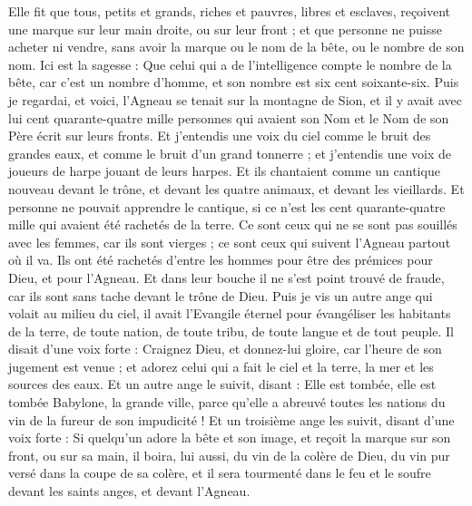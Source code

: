 \begin{multicols}{2}
Elle fit que tous, petits et grands, riches et pauvres, libres et esclaves, reçoivent une marque sur leur main droite, ou sur leur front ;
et que personne ne puisse acheter ni vendre, sans avoir la marque ou le nom de la bête, ou le nombre de son nom.
Ici est la sagesse : Que celui qui a de l'intelligence compte le nombre de la bête, car c'est un nombre d'homme, et son nombre est six cent soixante-six.
\VerseOne{}Puis je regardai, et voici, l'Agneau se tenait sur la montagne de Sion, et il y avait avec lui cent quarante-quatre mille personnes qui avaient son Nom et le Nom de son Père écrit sur leurs fronts.
Et j'entendis une voix du ciel comme le bruit des grandes eaux, et comme le bruit d'un grand tonnerre ; et j'entendis une voix de joueurs de harpe jouant de leurs harpes.
Et ils chantaient comme un cantique nouveau devant le trône, et devant les quatre animaux, et devant les vieillards. Et personne ne pouvait apprendre le cantique, si ce n'est les cent quarante-quatre mille qui avaient été rachetés de la terre.
Ce sont ceux qui ne se sont pas souillés avec les femmes, car ils sont vierges ; ce sont ceux qui suivent l'Agneau partout où il va. Ils ont été rachetés d'entre les hommes pour être des prémices pour Dieu, et pour l'Agneau.
Et dans leur bouche il ne s'est point trouvé de fraude, car ils sont sans tache devant le trône de Dieu.
Puis je vis un autre ange qui volait au milieu du ciel, il avait l'Evangile éternel pour évangéliser les habitants de la terre, de toute nation, de toute tribu, de toute langue et de tout peuple.
Il disait d'une voix forte : Craignez Dieu, et donnez-lui gloire, car l'heure de son jugement est venue ; et adorez celui qui a fait le ciel et la terre, la mer et les sources des eaux.
Et un autre ange le suivit, disant : Elle est tombée, elle est tombée Babylone, la grande ville, parce qu'elle a abreuvé toutes les nations du vin de la fureur de son impudicité !
Et un troisième ange les suivit, disant d'une voix forte : Si quelqu'un adore la bête et son image, et reçoit la marque sur son front, ou sur sa main,
il boira, lui aussi, du vin de la colère de Dieu, du vin pur versé dans la coupe de sa colère, et il sera tourmenté dans le feu et le soufre devant les saints anges, et devant l'Agneau.

\end{multicols}
